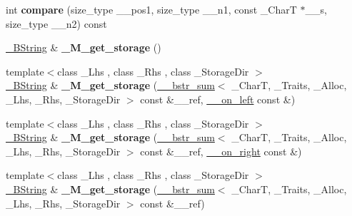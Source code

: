 \begin{DoxyCompactItemize}
\mbox{\label{class____bstr__sum_a6fb286f14530da2a290706b61b1f7959}} 
int {\bfseries compare} (size\+\_\+type \+\_\+\+\_\+pos1, size\+\_\+type \+\_\+\+\_\+n1, const \+\_\+\+CharT $\ast$\+\_\+\+\_\+s, size\+\_\+type \+\_\+\+\_\+n2) const
\item 
\mbox{\label{class____bstr__sum_a6eca8c171324ecf1da1899d48bebbc34}} 
\hyperlink{classbasic__string}{\+\_\+\+B\+String} \& {\bfseries \+\_\+\+M\+\_\+get\+\_\+storage} ()
\item 
\mbox{\label{class____bstr__sum_abefd935a234a1239af88237b5fdfa576}} 
{\footnotesize template$<$class \+\_\+\+Lhs , class \+\_\+\+Rhs , class \+\_\+\+Storage\+Dir $>$ }\\\hyperlink{classbasic__string}{\+\_\+\+B\+String} \& {\bfseries \+\_\+\+M\+\_\+get\+\_\+storage} (\hyperlink{class____bstr__sum}{\+\_\+\+\_\+bstr\+\_\+sum}$<$ \+\_\+\+CharT, \+\_\+\+Traits, \+\_\+\+Alloc, \+\_\+\+Lhs, \+\_\+\+Rhs, \+\_\+\+Storage\+Dir $>$ const \&\+\_\+\+\_\+ref, \hyperlink{struct____on__left}{\+\_\+\+\_\+on\+\_\+left} const \&)
\item 
\mbox{\label{class____bstr__sum_aa4032713bd9e4a83a29f15ba0dc46ac3}} 
{\footnotesize template$<$class \+\_\+\+Lhs , class \+\_\+\+Rhs , class \+\_\+\+Storage\+Dir $>$ }\\\hyperlink{classbasic__string}{\+\_\+\+B\+String} \& {\bfseries \+\_\+\+M\+\_\+get\+\_\+storage} (\hyperlink{class____bstr__sum}{\+\_\+\+\_\+bstr\+\_\+sum}$<$ \+\_\+\+CharT, \+\_\+\+Traits, \+\_\+\+Alloc, \+\_\+\+Lhs, \+\_\+\+Rhs, \+\_\+\+Storage\+Dir $>$ const \&\+\_\+\+\_\+ref, \hyperlink{struct____on__right}{\+\_\+\+\_\+on\+\_\+right} const \&)
\item 
\mbox{\label{class____bstr__sum_adc245eb3ab1c23282bf4138114e4e5d8}} 
{\footnotesize template$<$class \+\_\+\+Lhs , class \+\_\+\+Rhs , class \+\_\+\+Storage\+Dir $>$ }\\\hyperlink{classbasic__string}{\+\_\+\+B\+String} \& {\bfseries \+\_\+\+M\+\_\+get\+\_\+storage} (\hyperlink{class____bstr__sum}{\+\_\+\+\_\+bstr\+\_\+sum}$<$ \+\_\+\+CharT, \+\_\+\+Traits, \+\_\+\+Alloc, \+\_\+\+Lhs, \+\_\+\+Rhs, \+\_\+\+Storage\+Dir $>$ const \&\+\_\+\+\_\+ref)
\item 
\mbox{\label{class____bstr__sum_a27a010f9d86f1fe256299e85706d3664}} 

\end{DoxyCompactItemize}

